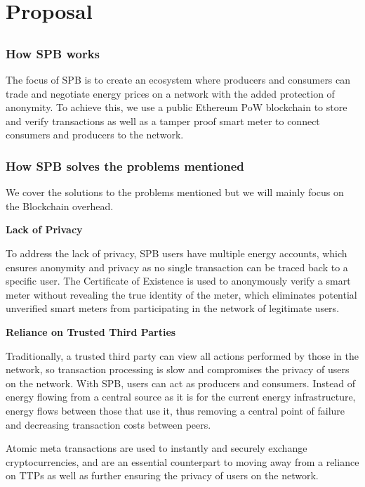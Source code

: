 \chapter{Proposal}\label{ch:eval}

\section{}

\subsection{How SPB works}

The focus of SPB is to create an ecosystem where producers and consumers can trade and negotiate energy prices on a network with the added protection of anonymity. To achieve this, we use a public Ethereum PoW blockchain to store and verify transactions as well as a tamper proof smart meter to connect consumers and producers to the network.

\subsection{How SPB solves the problems mentioned}

We cover the solutions to the problems mentioned but we will mainly focus on the Blockchain overhead.

\textbf{Lack of Privacy}

To address the lack of privacy, SPB users have multiple energy accounts, which ensures anonymity and privacy as no single transaction can be traced back to a specific user. The Certificate of Existence is used to anonymously verify a smart meter without revealing the true identity of the meter, which eliminates potential unverified smart meters from participating in the network of legitimate users.


\textbf{Reliance on Trusted Third Parties}

Traditionally, a trusted third party can view all actions performed by those in the network, so transaction processing is slow and compromises the privacy of users on the network. With SPB, users can act as producers and consumers. Instead of energy flowing from a central source as it is for the current energy infrastructure, energy flows between those that use it, thus removing a central point of failure and decreasing transaction costs between peers.

Atomic meta transactions are used to instantly and securely exchange cryptocurrencies, and are an essential counterpart to moving away from a reliance on TTPs as well as further ensuring the privacy of users on the network.


